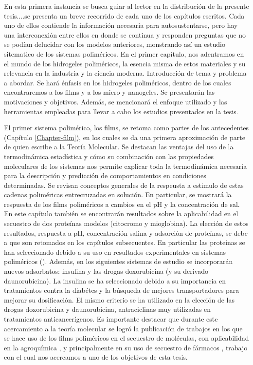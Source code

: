 \label{ruta}

 
En esta primera instancia se busca guiar al lector en la distribuci\'on de la presente tesis....se presenta un breve recorrido de cada uno de los cap\'itulos escritos.
Cada uno de ellos contiende la informaci\'on necesaria para autosustentarse, pero hay una interconexi\'on entre ellos en donde se continua y responden preguntas que no se pod\'ian delucidar con los modelos anteriores, monstrando as\'i un estudio sitematico de los sistemas polim\'ericos.
En el primer cap\'itulo, nos adentramos en el mundo de los hidrogeles polim\'ericos, la esencia misma de estos materiales y su relevancia en la industria y la ciencia moderna. Introducción de tema y problema a abordar.  Se har\'a \'enfasis en los hidrogeles polim\'ericos, dentro de los cuales encontraremos a los films y a los micro y nanogeles. Se presentar\'an las motivaciones y objetivos. Adem\'as, se mencionar\'a el enfoque utilizado y las herramientas empleadas para llevar a cabo los estudios presentados en la tesis.

El primer sistema polim\'erico, los films, se retoma como partes de los antecedentes (Cap\'itulo \ref{Chapter-film}), en los cuales se da una primera aproximaci\'on de parte de quien escribe a la Teor\'ia Molecular. Se destacan las ventajas del uso de la termodin\'amica estad\'istica y c\'omo su combinaci\'on con las propiedades moleculares de los sistemas nos permite explicar toda la termodin\'amica necesaria para la descripci\'on y predicci\'on de comportamientos en condiciones determinadas. Se revisan conceptos generales de la respeusta a estimulo de estas cadenas polim\'ericas entrecruzadas en soluci\'on. En particular, se mostrar\'a la respuesta de los films polim\'ericos a cambios en el pH y la concentraci\'on de sal. En este cap\'itulo tambi\'en se encontrar\'an resultados sobre la aplicabilidad en el secuestro de dos prote\'inas modelos (citocromo y mioglobina). La elecci\'on de estos resultados, respuesta a pH, concentraci\'on salina y adsorci\'on de prote\'inas, se debe a que son retomados en los cap\'itulos subsecuentes. En particular las prote\'inas se han seleccionado debido a su uso en resultados experimentales en sistemas polim\'ericos (\addcite). Adem\'as, en los siguientes sistemas de estudio se incorporar\'an nuevos adsorbatos: insulina y las drogas doxorubicina (y su derivado daunorubicina). La insulina se ha seleccionado debido a su importancia en tratamientos contra la diab\'etes y la b\'usqueda de mejores transportadores para mejorar su dosificaci\'on. El mismo criterio se ha utilizado en la elecci\'on de las drogas doxorubicina y daunorubicina, antraciclinas muy utilizadas en tratamientos anticancer\'igenos.
Es importante destacar que durante este acercamiento a la teor\'ia molecular se logr\'o la publicaci\'on de trabajos en los que se hace uso de los films polim\'ericos en el secuestro de mol\'eculas, con aplicabilidad en la agroqu\'imica \cite{perez2018using, perez2019molecular}, y principalmente en su uso de secuestro de f\'armacos \cite{perez2020triggering}, trabajo con el cual nos acercamos a uno de los objetivos de esta tesis. 

